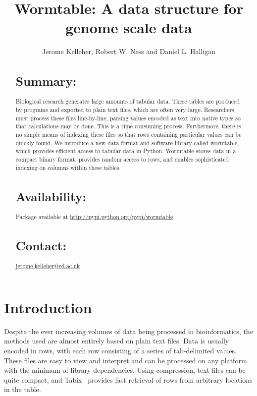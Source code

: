 \documentclass{bioinfo}
\begin{document}

\title[Wormtable]{Wormtable: A data structure for genome scale data}
\author[Kelleher \textit{et~al}]{Jerome Kelleher, Robert W. Ness 
and Daniel L. Halligan}
\address{
University of Edinburgh,
King's Buildings,
West Mains Road,
EH9 3JT,
UK
}



\maketitle

\begin{abstract}
\section{Summary:}
Biological research generates large amounts of tabular data.
These tables are produced by 
programs and exported to plain text files, which are often very large. 
Researchers must process these files 
line-by-line, parsing values encoded as text into native types so that 
calculations may be done. This is a time consuming process.
Furthermore, there is no simple means of indexing these files so that 
rows containing particular values can be quickly found. We introduce a new 
data format and software library called wormtable, which provides efficient 
access to tabular data in Python. Wormtable stores data in a compact
binary format, provides random access to rows, and enables sophisticated
indexing on columns within these tables. 
\section{Availability:}
Package available at 
\href{http://pypi.python.org/pypi/wormtable}{http://pypi.python.org/pypi/wormtable}

\section{Contact:} \href{jerome.kelleher@ed.ac.uk}{jerome.kelleher@ed.ac.uk}
\end{abstract}

\section{Introduction}
Despite the ever increasing volumes of data being processed in bioinformatics,
the methods used are almost entirely based on plain text files. Data is 
usually encoded in rows, with each row consisting of a series of tab-delimited 
values.
These files are easy to view and interpret and can be processed on 
any platform with the minimum of library dependencies. Using compression,
text files can be quite compact, and Tabix~\citep{li11} provides  
fast retrieval of rows from arbitrary locations in the table.
\end{document}
